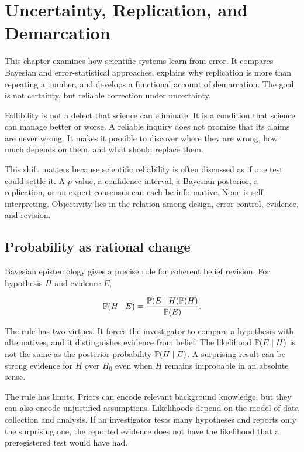 \chapter{Uncertainty, Replication, and Demarcation}
\label{ch:reliability}

\begin{chapterguide}
This chapter examines how scientific systems learn from error. It compares
Bayesian and error-statistical approaches, explains why replication is more
than repeating a number, and develops a functional account of demarcation.
The goal is not certainty, but reliable correction under uncertainty.
\end{chapterguide}

Fallibility is not a defect that science can eliminate. It is a condition that
science can manage better or worse. A reliable inquiry does not promise that
its claims are never wrong. It makes it possible to discover where they are
wrong, how much depends on them, and what should replace them.

This shift matters because scientific reliability is often discussed as if one
test could settle it. A \(p\)-value, a confidence interval, a Bayesian
posterior, a replication, or an expert consensus can each be informative. None
is self-interpreting. Objectivity lies in the relation among design, error
control, evidence, and revision.

\section{Probability as rational change}

Bayesian epistemology gives a precise rule for coherent belief revision. For
hypothesis \(H\) and evidence \(E\),

\[
  \mathbb{P}(H\mid E)
  =
  \frac{\mathbb{P}(E\mid H)\mathbb{P}(H)}{\mathbb{P}(E)}.
\]

The rule has two virtues. It forces the investigator to compare a hypothesis
with alternatives, and it distinguishes evidence from belief. The likelihood
\(\mathbb{P}(E\mid H)\) is not the same as the posterior probability
\(\mathbb{P}(H\mid E)\). A surprising result can be strong evidence for \(H\) over
\(H_0\) even when \(H\) remains improbable in an absolute sense.

The rule has limits. Priors can encode relevant background knowledge, but they
can also encode unjustified assumptions. Likelihoods depend on the model of
data collection and analysis. If an investigator tests many hypotheses and
reports only the surprising one, the reported evidence does not have the
likelihood that a preregistered test would have had.

